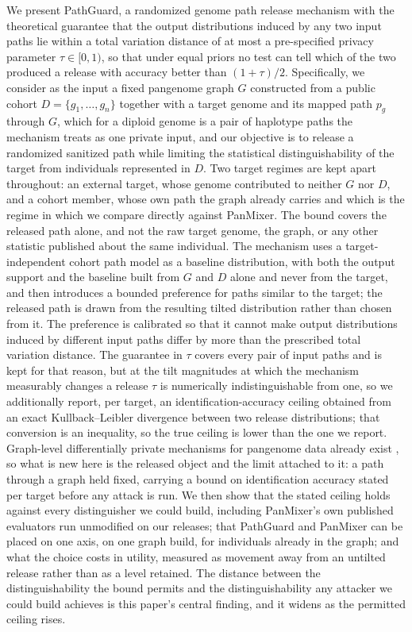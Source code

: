 We present PathGuard, a randomized genome path release mechanism with the theoretical
guarantee that the output distributions induced by any two input paths lie within a
total variation distance of at most a pre-specified privacy parameter
$\tau\in[0,1)$, so that under equal priors no test can tell which of the two produced
a release with accuracy better than $(1+\tau)/2$. Specifically, we consider as the
input a fixed pangenome graph $G$ constructed from a public cohort
$D=\{g_1,\ldots,g_n\}$ together with a target genome and its mapped path $p_g$
through $G$, which for a diploid genome is a pair of haplotype paths the mechanism
treats as one private input, and our objective is to release a randomized sanitized
path while limiting the statistical distinguishability of the target from individuals
represented in $D$. Two target regimes are kept apart throughout: an external target,
whose genome contributed to neither $G$ nor $D$, and a cohort member, whose own path
the graph already carries and which is the regime in which we compare directly
against PanMixer. The bound covers the released path alone, and not the raw target
genome, the graph, or any other statistic published about the same individual. The
mechanism uses a target-independent cohort path model as a baseline distribution,
with both the output support and the baseline built from $G$ and $D$ alone and never
from the target, and then introduces a bounded preference for paths similar to the
target; the released path is drawn from the resulting tilted distribution rather than
chosen from it. The preference is calibrated so that it cannot make output
distributions induced by different input paths differ by more than the prescribed
total variation distance. The guarantee in $\tau$ covers every pair of input paths and
is kept for that reason, but at the tilt magnitudes at which the mechanism measurably
changes a release $\tau$ is numerically indistinguishable from one, so we
additionally report, per target, an identification-accuracy ceiling obtained from an
exact Kullback--Leibler divergence between two release distributions; that conversion
is an inequality, so the true ceiling is lower than the one we report. Graph-level
differentially private mechanisms for pangenome data already exist \cite{privvg2022},
so what is new here is the released object and the limit attached to it: a path
through a graph held fixed, carrying a bound on identification accuracy stated per
target before any attack is run. We then show that the stated ceiling holds against
every distinguisher we could build, including PanMixer's own published evaluators run
unmodified on our releases; that PathGuard and PanMixer can be placed on one axis, on
one graph build, for individuals already in the graph; and what the choice costs in
utility, measured as movement away from an untilted release rather than as a level
retained. The distance between the distinguishability the bound permits and the
distinguishability any attacker we could build achieves is this paper's central
finding, and it widens as the permitted ceiling rises.
